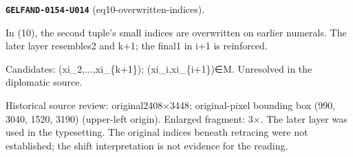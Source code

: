 \par\noindent\leavevmode{}\label{GELFAND-0154-U014}\textbf{\texttt{GELFAND-0154-U014}} (eq10-overwritten-indices).\nopagebreak[4]\par
In (10), the second tuple’s small indices are overwritten on earlier numerals. The later layer resembles2 and k+1; the final1 in i+1 is reinforced.\par
Candidates: (xi\_2,...,xi\_\{k+1\}); (xi\_i,xi\_\{i+1\})∈M. Unresolved in the diplomatic source.\par
Historical source review: original2408×3448; original-pixel bounding box (990, 3040, 1520, 3190) (upper-left origin). Enlarged fragment: 3×. The later layer was used in the typesetting. The original indices beneath retracing were not established; the shift interpretation is not evidence for the reading.\par\medskip
